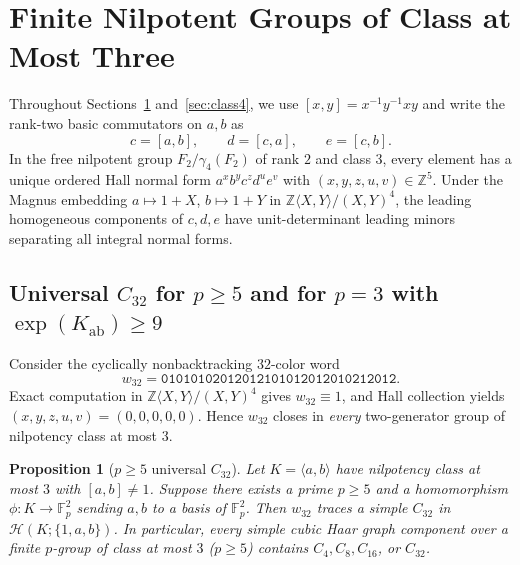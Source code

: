 \documentclass[11pt]{amsart}
\newtheorem{proposition}[theorem]{Proposition}
\theoremstyle{definition}
\theoremstyle{remark}
\newcommand{\F}{\mathbb{F}}
\newcommand{\Z}{\mathbb{Z}}
\newcommand{\Haar}{\mathcal{H}}
\begin{document}
\section{Finite Nilpotent Groups of Class at Most Three}\label{sec:class3}

Throughout Sections~\ref{sec:class3} and~\ref{sec:class4}, we use $[x,y] = x^{-1} y^{-1} x y$ and write the rank-two basic commutators on $a, b$ as
\[
c = [a,b],\qquad d = [c,a],\qquad e = [c,b].
\]
In the free nilpotent group $F_2 / \gamma_4(F_2)$ of rank $2$ and class $3$, every element has a unique ordered Hall normal form $a^x b^y c^z d^u e^v$ with $(x,y,z,u,v) \in \Z^5$. Under the Magnus embedding $a \mapsto 1+X$, $b \mapsto 1+Y$ in $\Z\langle X,Y\rangle/(X,Y)^4$, the leading homogeneous components of $c, d, e$ have unit-determinant leading minors separating all integral normal forms.

\subsection{Universal $C_{32}$ for $p \ge 5$ and for $p = 3$ with $\exp(K_{\mathrm{ab}}) \ge 9$}

Consider the cyclically nonbacktracking $32$-color word
\[
w_{32} = \mathtt{01010102012012101012012010212012}.
\]
Exact computation in $\Z\langle X,Y\rangle/(X,Y)^4$ gives $w_{32} \equiv 1$, and Hall collection yields $(x,y,z,u,v) = (0,0,0,0,0)$. Hence $w_{32}$ closes in \emph{every} two-generator group of nilpotency class at most $3$.

\begin{proposition}[$p \ge 5$ universal $C_{32}$]\label{prop:class3_pge5}
Let $K = \langle a, b \rangle$ have nilpotency class at most $3$ with $[a,b] \ne 1$. Suppose there exists a prime $p \ge 5$ and a homomorphism $\phi : K \to \F_p^2$ sending $a, b$ to a basis of $\F_p^2$. Then $w_{32}$ traces a simple $C_{32}$ in $\Haar(K; \{1,a,b\})$. In particular, every simple cubic Haar graph component over a finite $p$-group of class at most $3$ ($p \ge 5$) contains $C_4, C_8, C_{16}$, or $C_{32}$.
\end{proposition}
\end{document}
